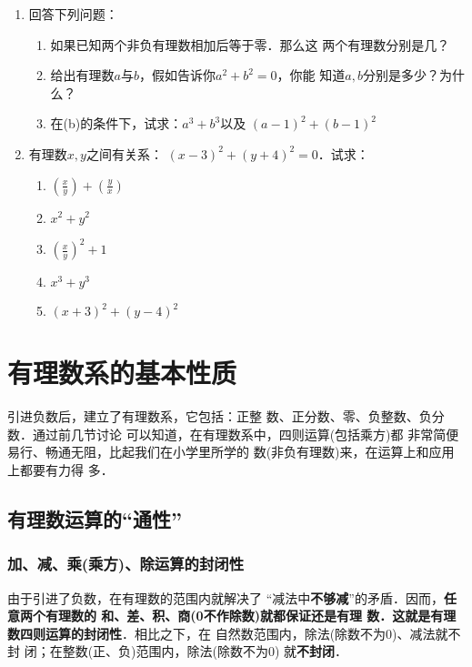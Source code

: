 \begin{enumerate}
\item  回答下列问题：
\begin{enumerate}
    \item 如果已知两个非负有理数相加后等于零．那么这
    两个有理数分别是几？
    \item 给出有理数$a$与$b$，假如告诉你$a^2 +b^2=0$，你能
    知道$a, b$分别是多少？为什么？
    \item 在(b)的条件下，试求：$a^3+b^3$以及
    $(a-1)^2+(b-1)^2$
\end{enumerate}


\item  有理数$x,  y$之间有关系：
$(x-3)^2+(y+4)^2=0$．试求：
\begin{multicols}{2}
    \begin{enumerate}
        \item $\left(\frac{x}{y}\right)+\left(\frac{y}{x}\right)$
        \item $x^2+y^2$
        \item $\left(\frac{x}{y}\right)^2+1$
        \item $x^3+y^3$
        \item $(x+3)^2+(y-4)^2$
    \end{enumerate}
\end{multicols}
\end{enumerate}

\section{有理数系的基本性质}
    引进负数后，建立了有理数系，它包括：正整
数、正分数、零、负整数、负分数．通过前几节讨论
可以知道，在有理数系中，四则运算(包括乘方)都
非常简便易行、畅通无阻，比起我们在小学里所学的
数(非负有理数)来，在运算上和应用上都要有力得
多．

\subsection{有理数运算的“通性”}
  \subsubsection{加、减、乘(乘方)、除运算的封闭性}
    由于引进了负数，在有理数的范围内就解决了
  “减法中\textbf{不够减}”的矛盾．因而，\textbf{任意两个有理数的
和、差、积、商(0不作除数)就都保证还是有理
数．这就是有理数四则运算的封闭性}．相比之下，在
自然数范围内，除法(除数不为0)、减法就不封
闭；在整数(正、负)范围内，除法(除数不为0)
就\textbf{不封闭}．

